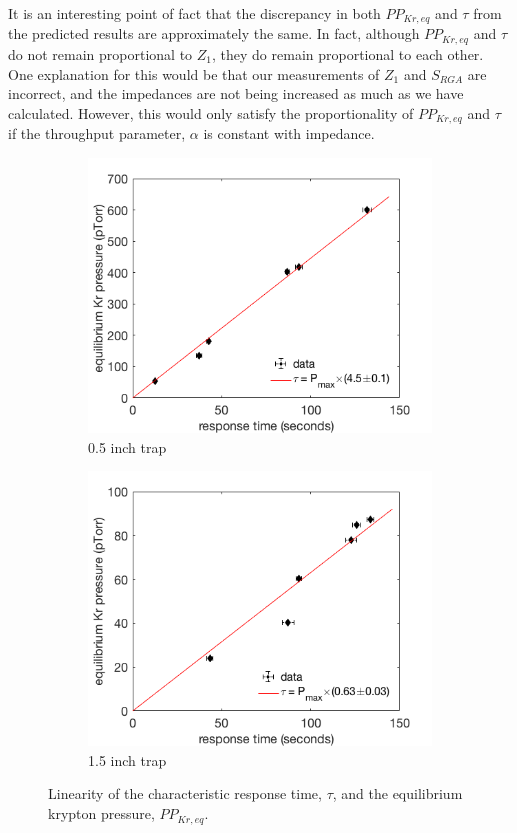 It is an interesting point of fact that the discrepancy in both $PP_{Kr,eq}$ and $\tau$ from the predicted results are approximately the same. In fact, although $PP_{Kr,eq}$ and $\tau$ do not remain proportional to $Z_1$, they do remain proportional to each other. One explanation for this would be that our measurements of $Z_1$ and $S_{RGA}$ are incorrect, and the impedances are not being increased as much as we have calculated. However, this would only satisfy the proportionality of $PP_{Kr,eq}$ and $\tau$ if the throughput parameter, $\alpha$ is constant with impedance. 
\begin{figure}[h!]
\centering
\begin{subfigure}{0.5\textwidth}
  \centering
  \includegraphics[width=\textwidth]{Figures/SLAC_imp_response_linfit.png}
  \caption{0.5 inch trap}
\end{subfigure}%
\begin{subfigure}{0.5\textwidth}
  \centering
  \includegraphics[width=\textwidth]{Figures/SLAC_imp_response_1p5in_linfit.png}
  \caption{1.5 inch trap}
\end{subfigure}
\caption{Linearity of the characteristic response time, $\tau$, and the equilibrium krypton pressure, $PP_{Kr,eq}$.} 
\label{fig:impresponse_lin}
\end{figure}

